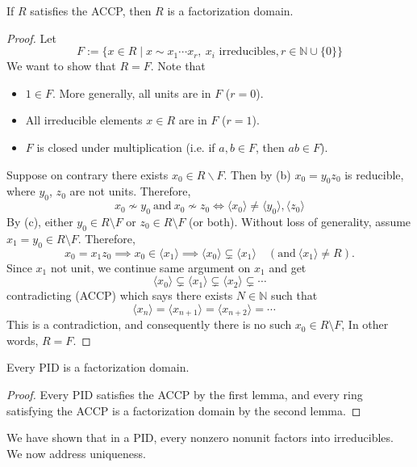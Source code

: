 \begin{lemma}
If $R$ satisfies the ACCP, then $R$ is a factorization domain.
\end{lemma}

\begin{proof}
Let 
$$F:=\{x \in R \mid x \sim x_1 \cdots x_r, \ x_i \text{ irreducibles}, r \in \mathbb{N} \cup\{0\}\}
$$ 
We want to show that $R = F$. Note that
\begin{itemize}
\item[(a)] $1 \in F$. More generally, all units are in $F$ ($r = 0$).
\item[(b)] All irreducible elements $x \in R$ are in $F$ ($r=1$).
\item[(c)] $F$ is closed under multiplication (i.e. if $a, b \in F$, then $ab \in F$).
\end{itemize}
Suppose on contrary there exists $x_0 \in R \backslash F$. Then by (b) $x_0 =y_0z_0$ is reducible, where $y_0$, $z_0$ are not units. 
Therefore,
$$x_0 \nsim y_0 \ \mathrm{and} \ x_0 \nsim z_0 \iff \langle x_0 \rangle \neq \langle y_0 \rangle, \langle z_0 \rangle$$
By (c), either $y_0 \in R \setminus F$ or $z_0 \in R \setminus F$ (or both). Without loss of generality, assume $x_1 = y_0 \in R \setminus F$. Therefore, 
$$x_0 = x_1 z_0 \implies x_0 \in \langle x_1 \rangle \implies
\langle x_0 \rangle \subsetneq \langle x_1 \rangle \quad (\mathrm{and}\ \langle x_1 \rangle \neq R).$$ 
Since $x_1$ not unit, we continue same argument on $x_1$ and get
$$\langle x_0 \rangle \subsetneq \langle x_1 \rangle \subsetneq \langle x_2 \rangle \subsetneq \cdots$$
contradicting (ACCP) which says there exists $N \in \mathbb{N}$ such that
$$\langle x_n \rangle = \langle x_{n+1} \rangle = \langle x_{n+2} \rangle = \cdots \quad $$
This is a contradiction, and consequently there is no such $x_0 \in R \setminus F$, In other words, $R = F$.
\end{proof}


\begin{theorem}
Every PID is a factorization domain.
\end{theorem}

\begin{proof}
Every PID satisfies the ACCP by the first lemma, and every ring satisfying the ACCP is a factorization domain by the second lemma.
\end{proof}

We have shown that in a PID, every nonzero nonunit factors into irreducibles. We now address uniqueness.

